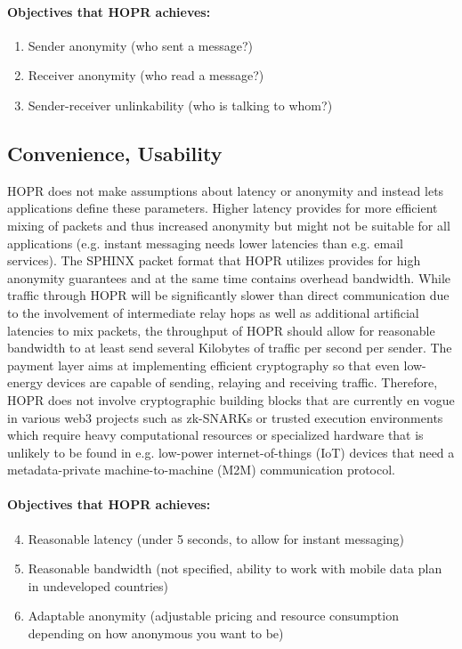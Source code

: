 \paragraph{Objectives that HOPR achieves:}

\begin{enumerate}
    \item Sender anonymity (who sent a message?)
    \item Receiver anonymity (who read a message?)
    \item Sender-receiver unlinkability (who is talking to whom?)
\end{enumerate}

\subsection{Convenience, Usability}
HOPR does not make assumptions about latency or anonymity and instead lets applications define these parameters. Higher latency provides for more efficient mixing of packets and thus increased anonymity but might not be suitable for all applications (e.g. instant messaging needs lower latencies than e.g. email services). The SPHINX packet format that HOPR utilizes provides for high anonymity guarantees and at the same time contains overhead bandwidth. While traffic through HOPR will be significantly slower than direct communication due to the involvement of intermediate relay hops as well as additional artificial latencies to mix packets, the throughput of HOPR should allow for reasonable bandwidth to at least send several Kilobytes of traffic per second per sender. The payment layer aims at implementing efficient cryptography so that even low-energy devices are capable of sending, relaying and receiving traffic. Therefore, HOPR does not involve cryptographic building blocks that are currently en vogue in various web3 projects such as zk-SNARKs or trusted execution environments which require heavy computational resources or specialized hardware that is unlikely to be found in e.g. low-power internet-of-things (IoT) devices that need a metadata-private machine-to-machine (M2M) communication protocol. 

\paragraph{Objectives that HOPR achieves:}

\begin{enumerate}\setcounter{enumi}{3}
    \item Reasonable latency (under 5 seconds, to allow for instant messaging)
    \item Reasonable bandwidth (not specified, ability to work with mobile data plan in undeveloped countries)
    \item Adaptable anonymity (adjustable pricing and resource consumption depending on how anonymous you want to be)
\end{enumerate}

